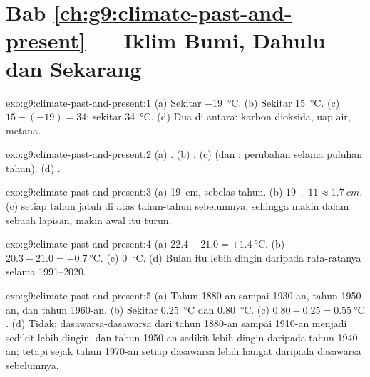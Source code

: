 \section*{Bab \ref{ch:g9:climate-past-and-present} --- Iklim Bumi, Dahulu dan Sekarang}

\begin{solution}{exo:g9:climate-past-and-present:1}
(a) Sekitar \qty{-19}{\degreeCelsius}. (b) Sekitar \qty{15}{\degreeCelsius}.
(c) $15 - (-19) = 34$: sekitar \qty{34}{\degreeCelsius}. (d) Dua di antara:
karbon dioksida, uap air, metana.
\end{solution}

\begin{solution}{exo:g9:climate-past-and-present:2}
(a) . (b) . (c)  (dan : perubahan selama
puluhan tahun). (d) .
\end{solution}

\begin{solution}{exo:g9:climate-past-and-present:3}
(a) \qty{19}{cm}, sebelas tahun. (b) $19 \div 11 \approx \qty{1.7}{cm}$.
(c)  setiap tahun jatuh di atas  tahun-tahun sebelumnya,
sehingga makin dalam sebuah lapisan, makin awal  itu turun.
\end{solution}

\begin{solution}{exo:g9:climate-past-and-present:4}
(a) $22.4 - 21.0 = +\qty{1.4}{\degreeCelsius}$. (b) $20.3 - 21.0 =
\qty{-0.7}{\degreeCelsius}$. (c) \qty{0}{\degreeCelsius}. (d) Bulan itu
lebih dingin daripada rata-ratanya selama 1991--2020.
\end{solution}

\begin{solution}{exo:g9:climate-past-and-present:5}
(a) Tahun 1880-an sampai 1930-an, tahun 1950-an, dan tahun 1960-an.
(b) Sekitar \qty{0.25}{\degreeCelsius} dan \qty{0.80}{\degreeCelsius}.
(c) $0.80 -
0.25 = \qty{0.55}{\degreeCelsius}$. (d) Tidak: dasawarsa-dasawarsa dari
tahun 1880-an sampai 1910-an menjadi sedikit lebih dingin, dan tahun
1950-an sedikit lebih dingin daripada tahun 1940-an; tetapi sejak tahun
1970-an setiap dasawarsa lebih hangat daripada dasawarsa sebelumnya.
\end{solution}

